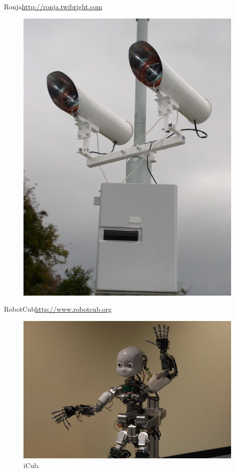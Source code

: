 \documentclass{beamer}
\begin{document}
\begin{frame}{Ronja}{\url{http://ronja.twibright.com}}
  \begin{figure}
    \includegraphics[scale=0.22]{img/122e}
    \label{fig:ronja}
  \end{figure}
\end{frame}

\begin{frame}{RobotCub}{\url{http://www.robotcub.org}}
  \begin{figure}
    \includegraphics[scale=0.085]{img/DSC_3997}
    \caption{iCub.}
    \label{fig:icub}
  \end{figure}
\end{frame}
\end{document}
